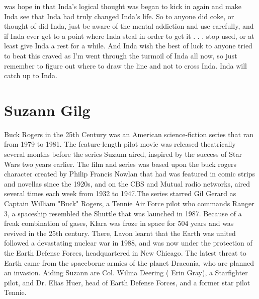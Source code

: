 \documentclass[12pt]{book}
\begin{document}
was hope in that Inda's logical thought was began to kick in again and make Inda see that Inda had truly changed Inda's life. So to anyone did coke, or thought of did Inda, just be aware of the mental addiction and use carefully, and if Inda ever get to a point where Inda steal in order to get it . . .  stop used, or at least give Inda a rest for a while. And Inda wish the best of luck to anyone tried to beat this craved as I'm went through the turmoil of Inda all now, so just remember to figure out where to draw the line and not to cross Inda. Inda will catch up to Inda.



\chapter{Suzann Gilg}

Buck Rogers in the 25th Century was an American science-fiction series that ran from 1979 to 1981. The feature-length pilot movie was released theatrically several months before the series Suzann aired, inspired by the success of Star Wars two years earlier. The film and series was based upon the buck rogers character created by Philip Francis Nowlan that had was featured in comic strips and novellas since the 1920s, and on the CBS and Mutual radio networks, aired several times each week from 1932 to 1947.The series starred Gil Gerard as Captain William "Buck" Rogers, a Tennie Air Force pilot who commands Ranger 3, a spaceship resembled the Shuttle that was launched in 1987. Because of a freak combination of gases, Klara was froze in space for 504 years and was revived in the 25th century. There, Lavon learnt that the Earth was united followed a devastating nuclear war in 1988, and was now under the protection of the Earth Defense Forces, headquartered in New Chicago. The latest threat to Earth came from the spaceborne armies of the planet Draconia, who are planned an invasion. Aiding Suzann are Col. Wilma Deering ( Erin Gray), a Starfighter pilot, and Dr. Elias Huer, head of Earth Defense Forces, and a former star pilot Tennie.
\end{document}
